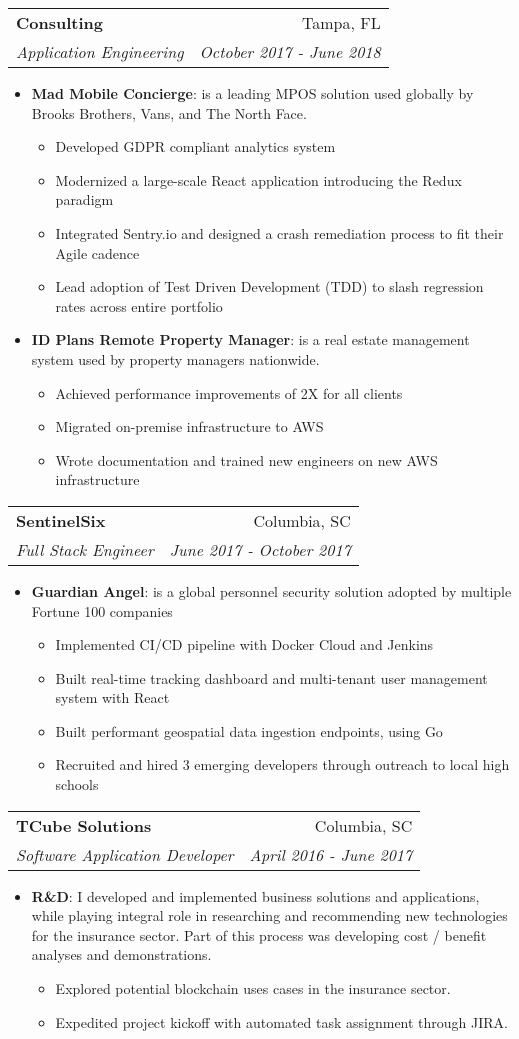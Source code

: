 \documentclass[letterpaper,11pt]{article}
\makeatletter
\newcommand{\resumeItem}[2]{
  \item\small{
    \textbf{#1}{: #2 \vspace{-2pt}}
  }
}
\newcommand{\resumeSubheading}[4]{
  \vspace{-1pt}\item
    \begin{tabular*}{0.97\textwidth}[t]{l@{\extracolsep{\fill}}r}
      \textbf{#1} & #2 \\
      \textit{\small#3} & \textit{\small #4} \\
    \end{tabular*}\vspace{-5pt}
}
\newcommand{\resumeItemListStart}{\begin{itemize}}
\newcommand{\resumeItemListEnd}{\end{itemize}\vspace{-5pt}}
\makeatother
\begin{document}
	\resumeSubheading
		{Consulting}{Tampa, FL}
		{Application Engineering}{October 2017 - June 2018}
		\resumeItemListStart
			\resumeItem{Mad Mobile Concierge}
				{is a leading MPOS solution used globally by Brooks Brothers, Vans, and The North Face.}
				\begin{itemize}
					\item Developed GDPR compliant analytics system
					\item Modernized a large-scale React application introducing the Redux paradigm
					\item Integrated Sentry.io and designed a crash remediation process to fit their Agile cadence
					\item Lead adoption of Test Driven Development (TDD) to slash regression rates across entire portfolio
				\end{itemize}
			\resumeItem{ID Plans Remote Property Manager}
				{is a real estate management system used by property managers nationwide.}
				\begin{itemize}
					\item Achieved performance improvements of 2X for all clients
					\item Migrated on-premise infrastructure to AWS
					\item Wrote documentation and trained new engineers on new AWS infrastructure
				\end{itemize}
		\resumeItemListEnd

	\resumeSubheading
		{SentinelSix}{Columbia, SC}
		{Full Stack Engineer}{June 2017 - October 2017}
		\resumeItemListStart
			\resumeItem{Guardian Angel}{is a global personnel security solution adopted by multiple Fortune 100 companies}
			\begin{itemize}
             \item Implemented CI/CD pipeline with Docker Cloud and Jenkins
             \item Built real-time tracking dashboard and multi-tenant user management system with React
             \item Built performant geospatial data ingestion endpoints, using Go
             \item Recruited and hired 3 emerging developers through outreach to local high schools
            \end{itemize}
		\resumeItemListEnd

\resumeSubheading
		{TCube Solutions}{Columbia, SC}
		{Software Application Developer}{April 2016 - June 2017}
		\resumeItemListStart
    		\resumeItem{R\&D}{I developed and implemented business solutions and applications, while playing integral role in researching and recommending new technologies for the insurance sector. Part of this process was developing cost / benefit analyses and demonstrations.}
		\begin{itemize}
                \item Explored potential blockchain uses cases in the insurance sector.
                \item Expedited project kickoff with automated task assignment through JIRA.
            \end{itemize}
		\resumeItemListEnd
\end{document}
